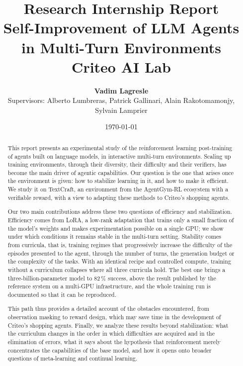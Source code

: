 \documentclass[11pt,a4paper]{article}
\title{\Large \textbf{Research Internship Report}\\ \huge \textbf{Self-Improvement of LLM Agents in Multi-Turn Environments}\\ \large Criteo AI Lab}
\author{\textbf{Vadim Lagresle} \\ Supervisors: Alberto Lumbreras, Patrick Gallinari, Alain Rakotomamonjy, Sylvain Lamprier}
\date{\today}
\begin{document}
\maketitle

\vspace{2cm}



\begin{abstract}
\noindent This report presents an experimental study of the reinforcement learning post-training of agents built on language models, in interactive multi-turn environments. Scaling up training environments, through their diversity, their difficulty and their verifiers, has become the main driver of agentic capabilities. Our question is the one that arises once the environment is given: how to stabilize learning in it, and how to make it efficient. We study it on TextCraft, an environment from the AgentGym-RL ecosystem with a verifiable reward, with a view to adapting these methods to Criteo's shopping agents.

Our two main contributions address these two questions of efficiency and stabilization. Efficiency comes from LoRA, a low-rank adaptation that trains only a small fraction of the model's weights and makes experimentation possible on a single GPU; we show under which conditions it remains stable in the multi-turn setting. Stability comes from curricula, that is, training regimes that progressively increase the difficulty of the episodes presented to the agent, through the number of turns, the generation budget or the complexity of the tasks. With an identical recipe and controlled compute, training without a curriculum collapses where all three curricula hold. The best one brings a three-billion-parameter model to 82\,\% success, above the result published by the reference system on a multi-GPU infrastructure, and the whole training run is documented so that it can be reproduced.

This path thus provides a detailed account of the obstacles encountered, from observation masking to reward design, which may save time in the development of Criteo's shopping agents. Finally, we analyze these results beyond stabilization: what the curriculum changes in the order in which difficulties are acquired and in the elimination of errors, what it says about the hypothesis that reinforcement merely concentrates the capabilities of the base model, and how it opens onto broader questions of meta-learning and continual learning.
\end{abstract}
\end{document}
